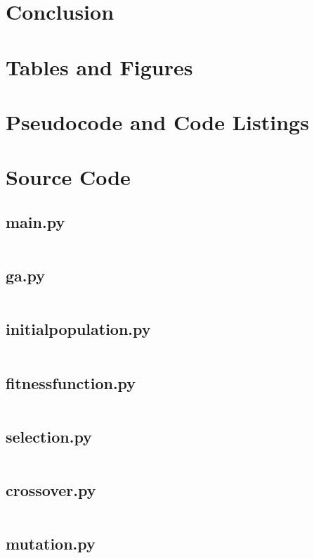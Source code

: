 \documentclass[a4paper, 12pt]{report}
\begin{document}
\chapter{Conclusion}  %

\renewcommand\bibname{References}


\appendix

\chapter{Tables and Figures} %

\chapter{Pseudocode and Code Listings} %

\chapter{Source Code}

\section{main.py}
\inputminted[linenos, fontsize=\footnotesize]{Python}{../main.py}

\section{ga.py}
\inputminted[linenos, fontsize=\footnotesize]{Python}{../modules/ga.py}

\section{initial{\textunderscore}population.py}
\inputminted[linenos, fontsize=\footnotesize]{Python}{
	../modules/initial_population.py}

\section{fitness{\textunderscore}function.py}
\inputminted[linenos, fontsize=\footnotesize]{Python}{
	../modules/fitness_function.py}

\section{selection.py}
\inputminted[linenos, fontsize=\footnotesize]{Python}{../modules/selection.py}

\section{crossover.py}
\inputminted[linenos, fontsize=\footnotesize]{Python}{../modules/crossover.py}

\section{mutation.py}
\inputminted[linenos, fontsize=\footnotesize]{Python}{../modules/mutation.py}
\end{document}
